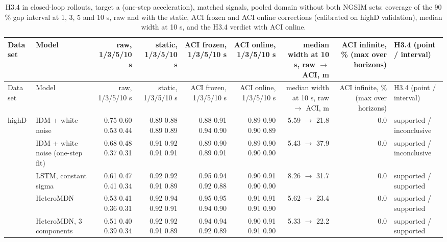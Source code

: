 \begingroup
\footnotesize
\begin{longtable}{llrrrrrrl}
\caption{H3.4 in closed-loop rollouts, target a (one-step acceleration), matched signals, pooled domain without both NGSIM sets: coverage of the 90 \% gap interval at 1, 3, 5 and 10 s, raw and with the static, ACI frozen and ACI online corrections (calibrated on highD validation), median width at 10 s, and the H3.4 verdict with ACI online.}\label{tab:t4-coverage--lodo-ngsim-all--a} \\
\toprule
Data set & Model & raw, 1/3/5/10 s & static, 1/3/5/10 s & ACI frozen, 1/3/5/10 s & ACI online, 1/3/5/10 s & median width at 10 s, raw $\rightarrow$ ACI, m & ACI infinite, \% (max over horizons) & H3.4 (point / interval) \\
\midrule
\endfirsthead
\toprule
Data set & Model & raw, 1/3/5/10 s & static, 1/3/5/10 s & ACI frozen, 1/3/5/10 s & ACI online, 1/3/5/10 s & median width at 10 s, raw $\rightarrow$ ACI, m & ACI infinite, \% (max over horizons) & H3.4 (point / interval) \\
\midrule
\endhead
\bottomrule
\endlastfoot
highD & IDM + white noise & 0.75 0.60 0.53 0.44 & 0.89 0.88 0.89 0.89 & 0.88 0.91 0.94 0.90 & 0.89 0.90 0.90 0.89 & 5.59 $\rightarrow$ 21.8 & 0.0 & supported / inconclusive \\
 & IDM + white noise (one-step fit) & 0.68 0.48 0.37 0.31 & 0.91 0.92 0.91 0.91 & 0.89 0.90 0.89 0.91 & 0.89 0.90 0.90 0.90 & 5.43 $\rightarrow$ 37.9 & 0.0 & supported / inconclusive \\
 & LSTM, constant sigma & 0.61 0.47 0.41 0.34 & 0.92 0.92 0.91 0.89 & 0.95 0.94 0.92 0.88 & 0.90 0.91 0.90 0.90 & 8.26 $\rightarrow$ 31.7 & 0.0 & supported / supported \\
 & HeteroMDN & 0.53 0.41 0.36 0.31 & 0.92 0.94 0.92 0.91 & 0.95 0.95 0.94 0.90 & 0.91 0.91 0.91 0.90 & 5.62 $\rightarrow$ 23.4 & 0.0 & supported / supported \\
 & HeteroMDN, 3 components & 0.51 0.40 0.39 0.34 & 0.92 0.92 0.91 0.89 & 0.94 0.94 0.92 0.89 & 0.90 0.91 0.91 0.90 & 5.33 $\rightarrow$ 22.2 & 0.0 & supported / supported \\

\end{longtable}

